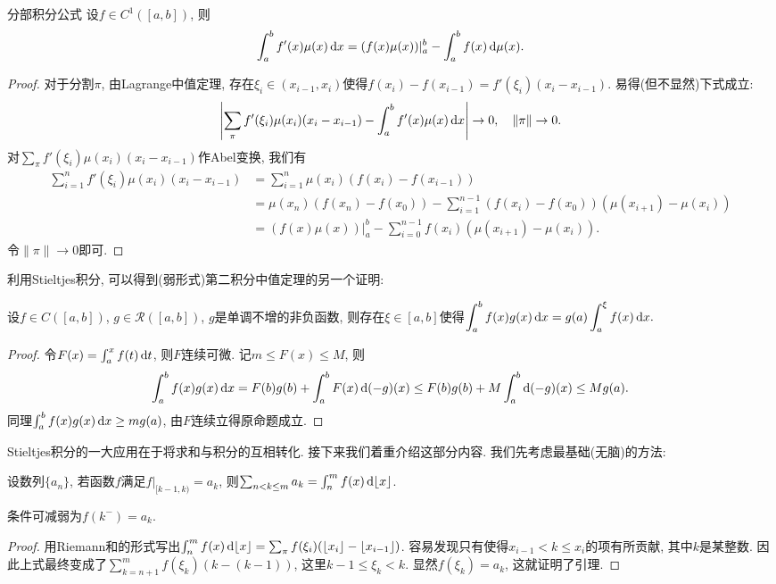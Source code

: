 \begin{proposition}{分部积分公式}
	设$f \in C^1([a,b])$, 则$$\int_a^b f'(x)\mu (x) \mathop{}\!\mathrm{d} x = (f(x)\mu (x)) |_a^b - \int_a^b f(x) \mathop{}\!\mathrm{d} \mu (x) .$$
\end{proposition}
\begin{proof}
	对于分割$\pi$, 由Lagrange中值定理, 存在$\xi _i \in (x_{i-1},x_i)$使得$f(x_i)-f(x_{i-1})=f'(\xi _i)(x_i-x_{i-1})$. 易得(但不显然)下式成立: $$\left| \sum_{\pi} f'(\xi _i)\mu (x_i)(x_i-x_{i-1})-\int_a^b f'(x) \mu (x) \mathop{}\!\mathrm{d} x \right| \to 0,\quad \| \pi \| \to 0. $$
	对$\sum_{\pi} f'(\xi _i)\mu (x_i)(x_i-x_{i-1})$作Abel变换, 我们有
	\begin{align*}
		\sum_{i=1}^{n} f'(\xi _i)\mu (x_i)(x_i-x_{i-1}) &= \sum_{i=1}^{n} \mu (x_i)(f(x_i)-f(x_{i-1})) \\
		&= \mu (x_n)(f(x_n)-f(x_0)) - \sum_{i=1}^{n-1} (f(x_i)-f(x_0))(\mu (x_{i+1})-\mu (x_i)) \\
		&= (f(x)\mu (x))|_a^b - \sum_{i=0}^{n-1} f(x_i)(\mu (x_{i+1})-\mu (x_i)). 
	\end{align*}
	令$\| \pi \|\to 0$即可. 
\end{proof}

利用Stieltjes积分, 可以得到(弱形式)第二积分中值定理的另一个证明: 

\begin{example}
	设$f \in C([a,b])$, $g \in \mathcal{R}([a,b])$, $g$是单调不增的非负函数, 则存在$\xi \in [a,b]$使得$\displaystyle \int_a^b f(x) g(x) \mathop{}\!\mathrm{d} x = g(a) \int_a^{\xi} f(x) \mathop{}\!\mathrm{d} x.$
\end{example}
\begin{proof}
	令$F(x)=\int_a^x f(t) \mathop{}\!\mathrm{d} t$, 则$F$连续可微. 记$m \leq F(x) \leq M$, 则$$\int_a^b f(x)g(x) \mathop{}\!\mathrm{d} x = F(b)g(b) + \int_a^b F(x)\mathop{}\!\mathrm{d} (-g)(x) \leq F(b)g(b)+M\int_a^b \mathop{}\!\mathrm{d} (-g)(x) \leq Mg(a).$$
	同理$\int_a^b f(x)g(x) \mathop{}\!\mathrm{d} x \geq mg(a)$, 由$F$连续立得原命题成立. 
\end{proof}

Stieltjes积分的一大应用在于将求和与积分的互相转化. 接下来我们着重介绍这部分内容. 我们先考虑最基础(无脑)的方法: 

\begin{lemma}{}
	设数列$\{ a_n \}$, 若函数$f$满足$f|_{[k-1,k)}=a_k$, 则$\sum_{n<k\leq m} a_k = \int_n^m f(x) \mathop{}\!\mathrm{d} \lfloor x \rfloor$. 
\end{lemma}
\begin{remark}
	条件可减弱为$f(k^-)=a_k$. 
\end{remark}
\begin{proof}
	用Riemann和的形式写出$\int_n^m f(x) \mathop{}\!\mathrm{d} \lfloor x \rfloor=\sum _{\pi} f(\xi _i)(\lfloor x_i \rfloor-\lfloor x_{i-1} \rfloor)$. 容易发现只有使得$x_{i-1}<k\leq x_i$的项有所贡献, 其中$k$是某整数. 因此上式最终变成了$\sum_{k=n+1}^{m} f(\xi _k) (k-(k-1))$, 这里$k-1 \leq \xi _k < k$. 显然$f(\xi _k)=a_k$, 这就证明了引理. 
\end{proof}


